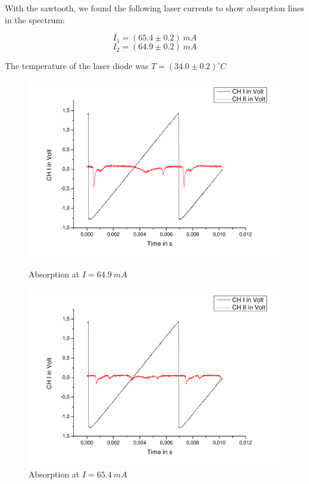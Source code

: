 With the sawtooth, we found the following laser currents to show absorption lines in the spectrum:

$$ I_1 = (65.4 \pm 0.2)\ mA $$
$$ I_2 = (64.9 \pm 0.2 )\ mA $$

The temperature of the laser diode was $T=(34.0 \pm 0.2)^\circ C$
 
\begin{figure}[H] 
\begin{minipage}{0.5\textwidth} 
\centering \includegraphics[width=\textwidth]{BilderAusw/DR_1.pdf}
\caption{Absorption at $I = 64.9\ mA$}
\end{minipage}
\begin{minipage}{0.5\textwidth} 
\centering \includegraphics[width=\textwidth]{BilderAusw/DR_2.pdf}
\caption{Absorption at $I = 65.4\ mA$}
\end{minipage}
\end{figure}

